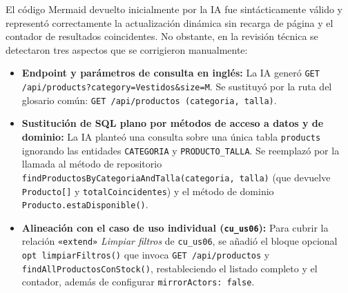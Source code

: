 El código Mermaid devuelto inicialmente por la IA fue sintácticamente válido y representó correctamente la actualización dinámica sin recarga de página y el contador de resultados coincidentes. No obstante, en la revisión técnica se detectaron tres aspectos que se corrigieron manualmente:
\begin{itemize}[leftmargin=*,nosep]
\item \textbf{Endpoint y parámetros de consulta en inglés:} La IA generó \texttt{GET /api/products?category=Vestidos\&size=M}. Se sustituyó por la ruta del glosario común: \texttt{GET /api/productos (categoria, talla)}.
\item \textbf{Sustitución de SQL plano por métodos de acceso a datos y de dominio:} La IA planteó una consulta sobre una única tabla \texttt{products} ignorando las entidades \texttt{CATEGORIA} y \texttt{PRODUCTO\_TALLA}. Se reemplazó por la llamada al método de repositorio \texttt{findProductosByCategoriaAndTalla(categoria, talla)} (que devuelve \texttt{Producto[]} y \texttt{totalCoincidentes}) y el método de dominio \texttt{Producto.estaDisponible()}.
\item \textbf{Alineación con el caso de uso individual (\texttt{cu\_us06}):} Para cubrir la relación \texttt{«extend»} \emph{Limpiar filtros} de \texttt{cu\_us06}, se añadió el bloque opcional \texttt{opt limpiarFiltros()} que invoca \texttt{GET /api/productos} y \texttt{findAllProductosConStock()}, restableciendo el listado completo y el contador, además de configurar \texttt{mirrorActors: false}.
\end{itemize}
